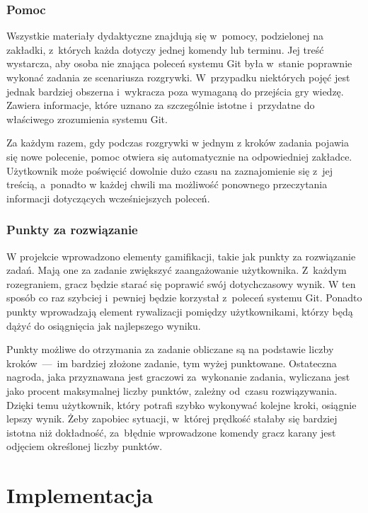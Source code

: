 \documentclass[12pt,a4paper,polish,thesis]{dcsbook}
\begin{document}
{	\subsection{Pomoc}
	
	Wszystkie materiały dydaktyczne znajdują się w~pomocy, podzielonej na zakładki, z~których każda dotyczy jednej komendy lub terminu. Jej treść wystarcza, aby osoba nie znająca poleceń systemu Git była w~stanie poprawnie wykonać zadania ze scenariusza rozgrywki. W~przypadku niektórych pojęć jest jednak bardziej obszerna i~wykracza poza wymaganą do przejścia gry wiedzę. Zawiera informacje, które uznano za szczególnie istotne i~przydatne do właściwego zrozumienia systemu Git.
	
	Za każdym razem, gdy podczas rozgrywki w jednym z kroków zadania pojawia się nowe polecenie, pomoc otwiera się automatycznie na odpowiedniej zakładce. Użytkownik może poświęcić dowolnie dużo czasu na zaznajomienie się z~jej treścią, a~ponadto w każdej chwili ma możliwość ponownego przeczytania informacji dotyczących wcześniejszych poleceń.  
	
	\subsection{Punkty za rozwiązanie}

	W projekcie wprowadzono elementy gamifikacji, takie jak punkty za rozwiązanie zadań. Mają one za zadanie zwiększyć zaangażowanie użytkownika. Z~każdym rozegraniem, gracz będzie starać się poprawić swój dotychczasowy wynik. W ten sposób co raz szybciej i~pewniej będzie korzystał z~poleceń systemu Git. Ponadto punkty wprowadzają element rywalizacji pomiędzy użytkownikami, którzy będą dążyć do osiągnięcia jak najlepszego wyniku.

	Punkty możliwe do otrzymania za zadanie obliczane są na podstawie liczby kroków~---~im bardziej złożone zadanie, tym wyżej punktowane. Ostateczna nagroda, jaka przyznawana jest graczowi za~wykonanie zadania, wyliczana jest jako procent maksymalnej liczby punktów, zależny od~czasu rozwiązywania. Dzięki temu użytkownik, który potrafi szybko wykonywać kolejne kroki, osiągnie lepszy wynik. Żeby zapobiec sytuacji, w~której prędkość stałaby się bardziej istotna niż dokładność, za~błędnie wprowadzone komendy gracz karany jest odjęciem określonej liczby punktów.
	
	\chapter{Implementacja}

}
\end{document}
